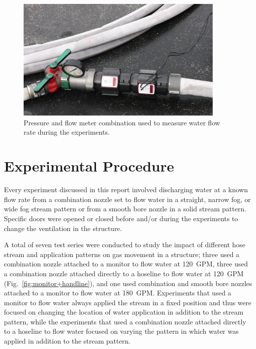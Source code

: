 \documentclass[12pt,oneside]{book}
\begin{document}
\begin{figure}[!ht]
	\includegraphics[width=4in]{../Figures/Pictures/flow_meter}
	\caption[Flow meter used to measure flow rate during experiments.]{Pressure and flow meter combination used to measure water flow rate during the experiments.}
	\label{fig:flow_meter}
\end{figure}
\FloatBarrier

\section{Experimental Procedure}
\label{sec:exp_procedure}
Every experiment discussed in this report involved discharging water at a known flow rate from a combination nozzle set to flow water in a straight, narrow fog, or wide fog stream pattern or from a smooth bore nozzle in a solid stream pattern. Specific doors were opened or closed before and/or during the experiments to change the ventilation in the structure. 

A total of seven test series were conducted to study the impact of different hose stream and application patterns on gas movement in a structure; three used a combination nozzle attached to a monitor to flow water at 120~GPM, three used a combination nozzle attached directly to a hoseline to flow water at 120~GPM (Fig.~\ref{fig:monitor+handline}), and one used combination and smooth bore nozzles attached to a monitor to flow water at 180~GPM. Experiments that used a monitor to flow water always applied the stream in a fixed position and thus were focused on changing the location of water application in addition to the stream pattern, while the experiments that used a combination nozzle attached directly to a hoseline to flow water focused on varying the pattern in which water was applied in addition to the stream pattern.
\end{document}

